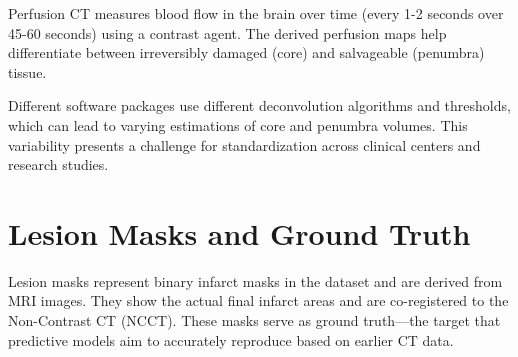 Perfusion CT measures blood flow in the brain over time (every 1-2 seconds over 45-60 seconds) using a contrast agent. The derived perfusion maps help differentiate between irreversibly damaged (core) and salvageable (penumbra) tissue.

Different software packages use different deconvolution algorithms and thresholds, which can lead to varying estimations of core and penumbra volumes. This variability presents a challenge for standardization across clinical centers and research studies.

\section{Lesion Masks and Ground Truth}

Lesion masks represent binary infarct masks in the dataset and are derived from MRI images. They show the actual final infarct areas and are co-registered to the Non-Contrast CT (NCCT). These masks serve as ground truth—the target that predictive models aim to accurately reproduce based on earlier CT data. 